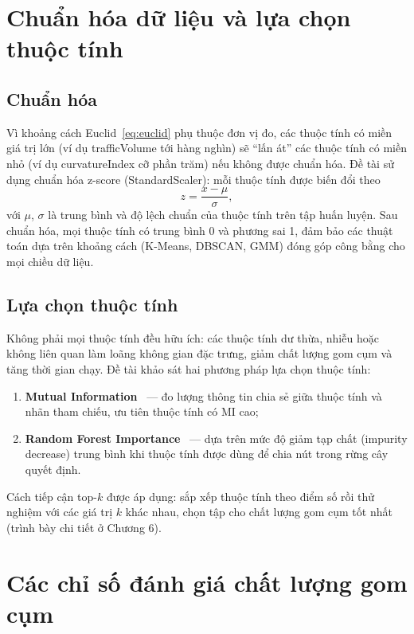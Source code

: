 \section{Chuẩn hóa dữ liệu và lựa chọn thuộc tính}

\subsection{Chuẩn hóa}
Vì khoảng cách Euclid~\eqref{eq:euclid} phụ thuộc đơn vị đo, các thuộc tính có miền giá trị lớn (ví dụ trafficVolume tới hàng nghìn) sẽ ``lấn át'' các thuộc tính có miền nhỏ (ví dụ curvatureIndex cỡ phần trăm) nếu không được chuẩn hóa. Đề tài sử dụng chuẩn hóa z-score (StandardScaler): mỗi thuộc tính được biến đổi theo
\begin{equation}
z = \frac{x - \mu}{\sigma},
\label{eq:zscore}
\end{equation}
với $\mu$, $\sigma$ là trung bình và độ lệch chuẩn của thuộc tính trên tập huấn luyện. Sau chuẩn hóa, mọi thuộc tính có trung bình 0 và phương sai 1, đảm bảo các thuật toán dựa trên khoảng cách (K-Means, DBSCAN, GMM) đóng góp công bằng cho mọi chiều dữ liệu.

\subsection{Lựa chọn thuộc tính}
Không phải mọi thuộc tính đều hữu ích: các thuộc tính dư thừa, nhiễu hoặc không liên quan làm loãng không gian đặc trưng, giảm chất lượng gom cụm và tăng thời gian chạy. Đề tài khảo sát hai phương pháp lựa chọn thuộc tính:
\begin{enumerate}[label=(\roman*),leftmargin=2.2cm,itemsep=2pt]
 \item \textbf{Mutual Information}~\cite{peng} --- đo lượng thông tin chia sẻ giữa thuộc tính và nhãn tham chiếu, ưu tiên thuộc tính có MI cao;
 \item \textbf{Random Forest Importance}~\cite{breiman} --- dựa trên mức độ giảm tạp chất (impurity decrease) trung bình khi thuộc tính được dùng để chia nút trong rừng cây quyết định.
\end{enumerate}
Cách tiếp cận top-$k$ được áp dụng: sắp xếp thuộc tính theo điểm số rồi thử nghiệm với các giá trị $k$ khác nhau, chọn tập cho chất lượng gom cụm tốt nhất (trình bày chi tiết ở Chương 6).

\section{Các chỉ số đánh giá chất lượng gom cụm}

